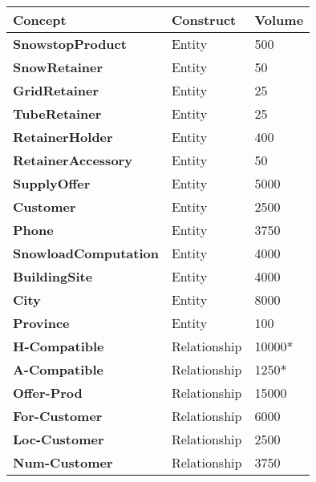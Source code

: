\begin{table}[H]
  \def\arraystretch{1.25}%
  \centering
  \begin{tabular}{ | m{4.5cm} | m{4.5cm}| m{4.5cm} |}
    \hline
    {\textbf{\large Concept}} & {\textbf{\large Construct}} & {\textbf{\large Volume}} \\
    \hline
    \color[HTML]{3531FF} \textbf{SnowstopProduct} & Entity & 500  \\
    \hline
    \color[HTML]{3531FF} \textbf{SnowRetainer} & Entity & 50 \\
    \hline
    \color[HTML]{3531FF} \textbf{GridRetainer} & Entity & 25 \\
    \hline
    \color[HTML]{3531FF} \textbf{TubeRetainer} & Entity & 25 \\
    \hline
    \color[HTML]{3531FF} \textbf{RetainerHolder} & Entity & 400 \\
    \hline
    \color[HTML]{3531FF} \textbf{RetainerAccessory} & Entity & 50 \\
    \hline
    \color[HTML]{3531FF} \textbf{SupplyOffer} & Entity & 5000\\
    \hline
    \color[HTML]{3531FF} \textbf{Customer} & Entity & 2500\\
    \hline
    \color[HTML]{3531FF} \textbf{Phone} & Entity & 3750 \\
    \hline
    \color[HTML]{3531FF} \textbf{SnowloadComputation} & Entity & 4000\\
    \hline
    \color[HTML]{3531FF} \textbf{BuildingSite} & Entity & 4000\\
    \hline
    \color[HTML]{3531FF} \textbf{City} & Entity & 8000 \\
    \hline
    \color[HTML]{3531FF} \textbf{Province} & Entity & 100 \\
    \hline
    \color[HTML]{3531FF} \textbf{H-Compatible} & Relationship & 10000* \\
    \hline
    \color[HTML]{3531FF} \textbf{A-Compatible} & Relationship & 1250* \\
    \hline
    \color[HTML]{3531FF} \textbf{Offer-Prod} & Relationship & 15000\\
    \hline
    \color[HTML]{3531FF} \textbf{For-Customer} & Relationship & 6000\\
    \hline
    \color[HTML]{3531FF} \textbf{Loc-Customer} & Relationship & 2500\\
    \hline
    \color[HTML]{3531FF} \textbf{Num-Customer} & Relationship & 3750 \\

\end{tabular}
\end{table}
